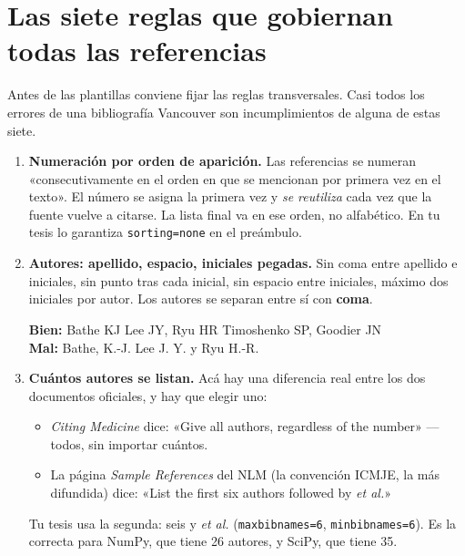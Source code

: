\documentclass[11pt,a4paper]{article}
\newcommand{\anot}[1]{{\color{gris}\footnotesize #1}}
\begin{document}
\section{Las siete reglas que gobiernan todas las referencias}
\label{sec:reglas}

Antes de las plantillas conviene fijar las reglas transversales. Casi todos los errores de
una bibliografía Vancouver son incumplimientos de alguna de estas siete.

\begin{enumerate}\setlength{\itemsep}{6pt}

\item \textbf{Numeración por orden de aparición.} Las referencias se numeran
  «consecutivamente en el orden en que se mencionan por primera vez en el texto». El número
  se asigna la primera vez y \emph{se reutiliza} cada vez que la fuente vuelve a citarse. La
  lista final va en ese orden, no alfabético.
  \anot{En tu tesis lo garantiza \texttt{sorting=none} en el preámbulo.}

\item \textbf{Autores: apellido, espacio, iniciales pegadas.} Sin coma entre apellido e
  iniciales, sin punto tras cada inicial, sin espacio entre iniciales, máximo dos iniciales
  por autor. Los autores se separan entre sí con \textbf{coma}.
  \par\vspace{3pt}\hspace{1.5em}\begin{minipage}{0.9\textwidth}\small
  \textcolor{bien}{\textbf{Bien:}} Bathe KJ \quad\textbullet\quad Lee JY, Ryu HR
  \quad\textbullet\quad Timoshenko SP, Goodier JN\\
  \textcolor{ojo}{\textbf{Mal:}} Bathe, K.-J. \quad\textbullet\quad Lee J. Y. y Ryu H.-R.
  \end{minipage}

\item \textbf{Cuántos autores se listan.} Acá hay una diferencia real entre los dos documentos
  oficiales, y hay que elegir uno:
  \par\vspace{3pt}
  \begin{minipage}{0.95\textwidth}\small
  \begin{itemize}
  \item \emph{Citing Medicine} dice: «Give all authors, regardless of the number» ---todos,
    sin importar cuántos.
  \item La página \emph{Sample References} del NLM (la convención ICMJE, la más difundida)
    dice: «List the first six authors followed by \emph{et al.}»
  \end{itemize}
  \end{minipage}
  \par\vspace{3pt}
  \anot{Tu tesis usa la segunda: seis y \emph{et al.} (\texttt{maxbibnames=6},
  \texttt{minbibnames=6}). Es la correcta para NumPy, que tiene 26 autores, y SciPy, que
  tiene 35.}


\end{enumerate}
\end{document}
